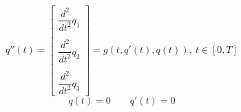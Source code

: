 \documentclass[12pt]{article}
\begin{document}
	$$q''(t) = \left[ \begin{array}{l} 
		\dfrac{d^2}{dt^2} q_1 \\\\ 
		\dfrac{d^2}{dt^2} q_2 \\\\ 
		\dfrac{d^2}{dt^2} q_3
	\end{array}
	\right] = g(t, q'(t), q(t)), \ t \in [0, T]$$
	$$q(t) = 0 \qquad q'(t) = 0$$
\end{document}
